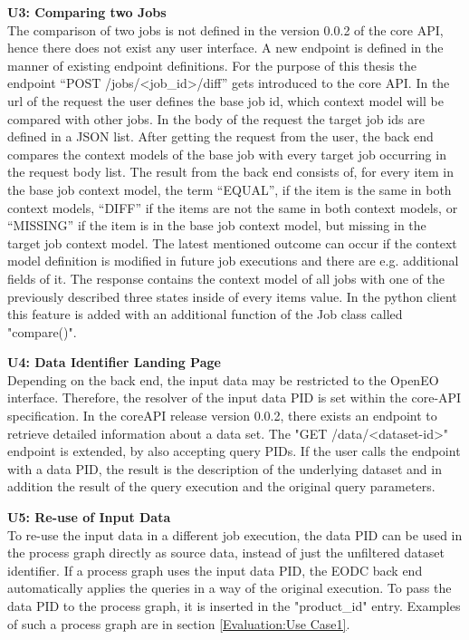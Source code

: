 \documentclass[draft,final]{vutinfth} %
\begin{document}
\textbf{U3: Comparing two Jobs} \\
The comparison of two jobs is not defined in the version 0.0.2 of the core API, hence there does not exist any user interface. A new endpoint is defined in the manner of existing endpoint definitions. For the purpose of this thesis the endpoint  “POST /jobs/<job\_id>/diff” gets introduced to the core API. In the url of the request the user defines the base job id, which context model will be compared with other jobs. In the body of the request the target job ids are defined in a JSON list. After getting the request from the user, the back end compares the context models of the base job with every target job occurring in the request body list. The result from the back end consists of, for every item in the base job context model, the term “EQUAL”, if the item is the same in both context models, “DIFF” if the items are not the same in both context models, or “MISSING” if the item is in the base job context model, but missing in the target job context model. The latest mentioned outcome can occur if the context model definition is modified in future job executions and there are e.g. additional fields of it. The response contains the context model of all jobs with one of the previously described three states inside of every items value. In the python client this feature is added with an additional function of the Job class called "compare()". 


\textbf{U4: Data Identifier Landing Page} \\
Depending on the back end, the input data may be restricted to the OpenEO interface. Therefore, the resolver of the input data PID is set within the core-API specification. In the coreAPI release version 0.0.2, there exists an endpoint to retrieve detailed information about a data set. The "GET /data/<dataset-id>" endpoint is extended, by also accepting query PIDs. If the user calls the endpoint with a data PID, the result is the description of the underlying dataset and in addition the result of the query execution and the original query parameters.

\textbf{U5: Re-use of Input Data} \\
To re-use the input data in a different job execution, the data PID can be used in the process graph directly as source data, instead of just the unfiltered dataset identifier. If a process graph uses the input data PID, the EODC back end automatically applies the queries in a way of the original execution. To pass the data PID to the process graph, it is inserted in the "product\_id" entry. Examples of such a process graph are in section \ref{Evaluation:Use Case1}.  
\end{document}
